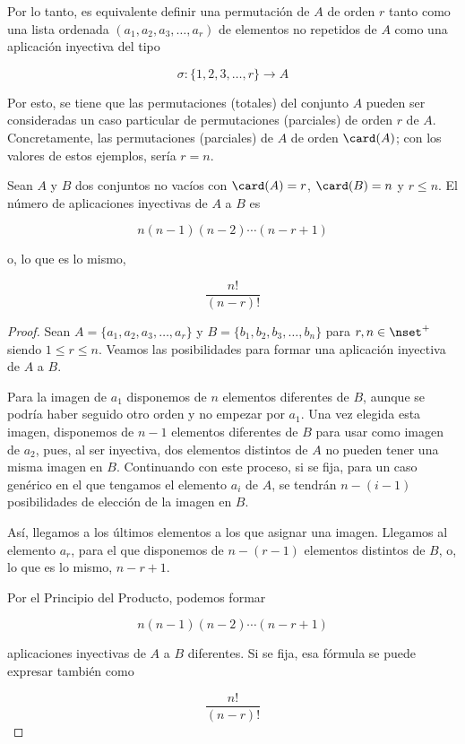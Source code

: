Por lo tanto, es equivalente definir una permutación de $A$ de orden $r$
tanto como una lista ordenada $(a_1, a_2, a_3, \ldots, a_r)$ de elementos no
repetidos de $A$ como una aplicación inyectiva del tipo

$$ \sigma: \{1, 2, 3, \ldots, r\} \longrightarrow A $$

\noindent Por esto, se tiene que las permutaciones (totales) del conjunto
$A$ pueden ser consideradas un caso particular de permutaciones (parciales)
de orden $r$ de $A$. Concretamente, las permutaciones (parciales) de $A$ de
orden $\card(A)$; con los valores de estos ejemplos, sería $r = n$.

\begin{theorem}
  Sean $A$ y $B$ dos conjuntos no vacíos con $\card(A) = r$, $\card(B) = n$
  y $r \leq n$. El número de aplicaciones inyectivas de $A$ a $B$ es

  $$ n(n - 1)(n - 2) \cdots (n - r + 1) $$

  \noindent o, lo que es lo mismo,

  $$ \frac{n!}{(n - r)!} $$
\end{theorem}

\begin{proof}
  Sean $A = \{a_1, a_2, a_3, \ldots, a_r\}$ y $B = \{b_1, b_2, b_3, \ldots,
  b_n\}$ para $r, n \in \nset^{+}$ siendo $1 \leq r \leq n$. Veamos las
  posibilidades para formar una aplicación inyectiva de $A$ a $B$.

  Para la imagen de $a_1$ disponemos de $n$ elementos diferentes de $B$,
  aunque se podría haber seguido otro orden y no empezar por $a_1$. Una vez
  elegida esta imagen, disponemos de $n - 1$ elementos diferentes de $B$
  para usar como imagen de $a_2$, pues, al ser inyectiva, dos elementos
  distintos de $A$ no pueden tener una misma imagen en $B$. Continuando con
  este proceso, si se fija, para un caso genérico en el que tengamos el
  elemento $a_i$ de $A$, se tendrán $n - (i - 1)$ posibilidades de elección
  de la imagen en $B$. 

  Así, llegamos a los últimos elementos a los que asignar una imagen.
  Llegamos al elemento $a_r$, para el que disponemos de $n - (r - 1)$
  elementos distintos de $B$, o, lo que es lo mismo, $n - r + 1$.

  Por el Principio del Producto, podemos formar

  $$ n(n - 1)(n - 2) \cdots (n - r + 1) $$

  \noindent aplicaciones inyectivas de $A$ a $B$ diferentes. Si se fija, esa
  fórmula se puede expresar también como

  $$ \frac{n!}{(n - r)!} $$
\end{proof}

